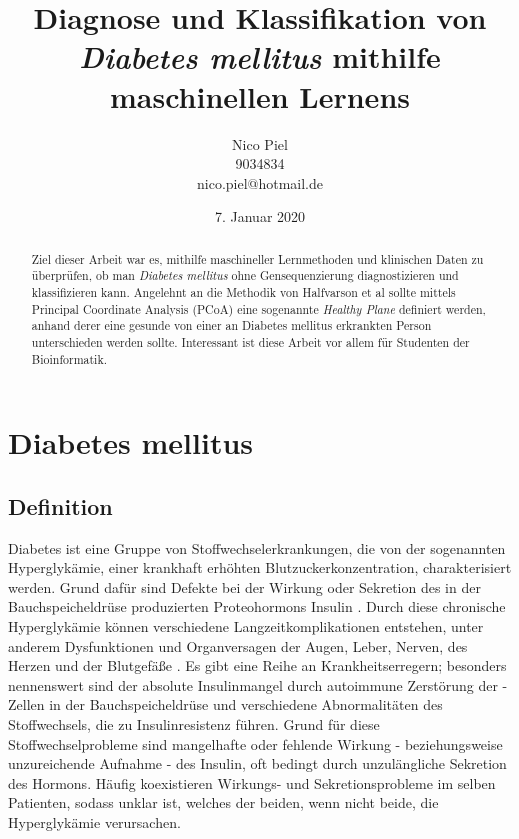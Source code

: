 \documentclass{article}
\title{Diagnose und Klassifikation von \textit{Diabetes mellitus} mithilfe maschinellen Lernens}
\author{Nico Piel \\ 9034834 \\ nico.piel@hotmail.de}
\date{7. Januar 2020}
\begin{document}
\maketitle

\newpage

\tableofcontents

\newpage

\begin{abstract}

Ziel dieser Arbeit war es, mithilfe maschineller Lernmethoden und klinischen Daten zu überprüfen, ob man \textit{Diabetes mellitus} ohne Gensequenzierung diagnostizieren und klassifizieren kann. 
Angelehnt an die Methodik von Halfvarson et al \cite{dyn} sollte mittels Principal Coordinate Analysis (PCoA) eine sogenannte \textit{Healthy Plane} definiert werden, anhand derer eine gesunde von einer an Diabetes mellitus erkrankten Person unterschieden werden sollte.
Interessant ist diese Arbeit vor allem für Studenten der Bioinformatik.

\end{abstract}

\newpage

\section{Diabetes mellitus}

\subsection{Definition}

Diabetes ist eine Gruppe von Stoffwechselerkrankungen, die von der sogenannten Hyperglykämie, einer krankhaft erhöhten Blutzuckerkonzentration, charakterisiert werden. Grund dafür sind Defekte bei der Wirkung oder Sekretion des in der Bauchspeicheldrüse produzierten Proteohormons Insulin \cite{ada}. Durch diese chronische Hyperglykämie können verschiedene Langzeitkomplikationen entstehen, unter anderem Dysfunktionen und Organversagen der Augen, Leber, Nerven, des Herzen und der Blutgefäße \cite{who}.
Es gibt eine Reihe an Krankheitserregern; besonders nennenswert sind der absolute Insulinmangel durch autoimmune Zerstörung der \textbeta-Zellen in der Bauchspeicheldrüse und verschiedene Abnormalitäten des Stoffwechsels, die zu Insulinresistenz führen. Grund für diese Stoffwechselprobleme sind mangelhafte oder fehlende Wirkung - beziehungsweise unzureichende Aufnahme - des Insulin, oft bedingt durch unzulängliche Sekretion des Hormons. Häufig koexistieren Wirkungs- und Sekretionsprobleme im selben Patienten, sodass unklar ist, welches der beiden, wenn nicht beide, die Hyperglykämie verursachen.
\end{document}

